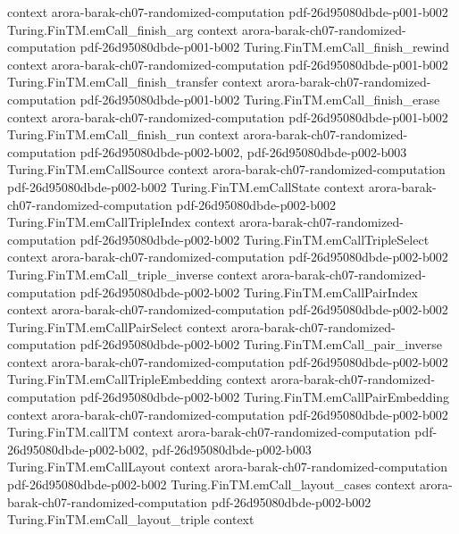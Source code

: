 \begin{theorem}
  {context}
  {arora-barak-ch07-randomized-computation}
  {pdf-26d95080dbde-p001-b002}
\proofstep
  {Turing.FinTM.emCall_finish_arg}
  {context}
  {arora-barak-ch07-randomized-computation}
  {pdf-26d95080dbde-p001-b002}
\proofstep
  {Turing.FinTM.emCall_finish_rewind}
  {context}
  {arora-barak-ch07-randomized-computation}
  {pdf-26d95080dbde-p001-b002}
\proofstep
  {Turing.FinTM.emCall_finish_transfer}
  {context}
  {arora-barak-ch07-randomized-computation}
  {pdf-26d95080dbde-p001-b002}
\proofstep
  {Turing.FinTM.emCall_finish_erase}
  {context}
  {arora-barak-ch07-randomized-computation}
  {pdf-26d95080dbde-p001-b002}
\proofstep
  {Turing.FinTM.emCall_finish_run}
  {context}
  {arora-barak-ch07-randomized-computation}
  {pdf-26d95080dbde-p002-b002,
    pdf-26d95080dbde-p002-b003}
\proofstep
  {Turing.FinTM.emCallSource}
  {context}
  {arora-barak-ch07-randomized-computation}
  {pdf-26d95080dbde-p002-b002}
\proofstep
  {Turing.FinTM.emCallState}
  {context}
  {arora-barak-ch07-randomized-computation}
  {pdf-26d95080dbde-p002-b002}
\proofstep
  {Turing.FinTM.emCallTripleIndex}
  {context}
  {arora-barak-ch07-randomized-computation}
  {pdf-26d95080dbde-p002-b002}
\proofstep
  {Turing.FinTM.emCallTripleSelect}
  {context}
  {arora-barak-ch07-randomized-computation}
  {pdf-26d95080dbde-p002-b002}
\proofstep
  {Turing.FinTM.emCall_triple_inverse}
  {context}
  {arora-barak-ch07-randomized-computation}
  {pdf-26d95080dbde-p002-b002}
\proofstep
  {Turing.FinTM.emCallPairIndex}
  {context}
  {arora-barak-ch07-randomized-computation}
  {pdf-26d95080dbde-p002-b002}
\proofstep
  {Turing.FinTM.emCallPairSelect}
  {context}
  {arora-barak-ch07-randomized-computation}
  {pdf-26d95080dbde-p002-b002}
\proofstep
  {Turing.FinTM.emCall_pair_inverse}
  {context}
  {arora-barak-ch07-randomized-computation}
  {pdf-26d95080dbde-p002-b002}
\proofstep
  {Turing.FinTM.emCallTripleEmbedding}
  {context}
  {arora-barak-ch07-randomized-computation}
  {pdf-26d95080dbde-p002-b002}
\proofstep
  {Turing.FinTM.emCallPairEmbedding}
  {context}
  {arora-barak-ch07-randomized-computation}
  {pdf-26d95080dbde-p002-b002}
\proofstep
  {Turing.FinTM.callTM}
  {context}
  {arora-barak-ch07-randomized-computation}
  {pdf-26d95080dbde-p002-b002,
    pdf-26d95080dbde-p002-b003}
\proofstep
  {Turing.FinTM.emCallLayout}
  {context}
  {arora-barak-ch07-randomized-computation}
  {pdf-26d95080dbde-p002-b002}
\proofstep
  {Turing.FinTM.emCall_layout_cases}
  {context}
  {arora-barak-ch07-randomized-computation}
  {pdf-26d95080dbde-p002-b002}
\proofstep
  {Turing.FinTM.emCall_layout_triple}
  {context}

\end{theorem}
